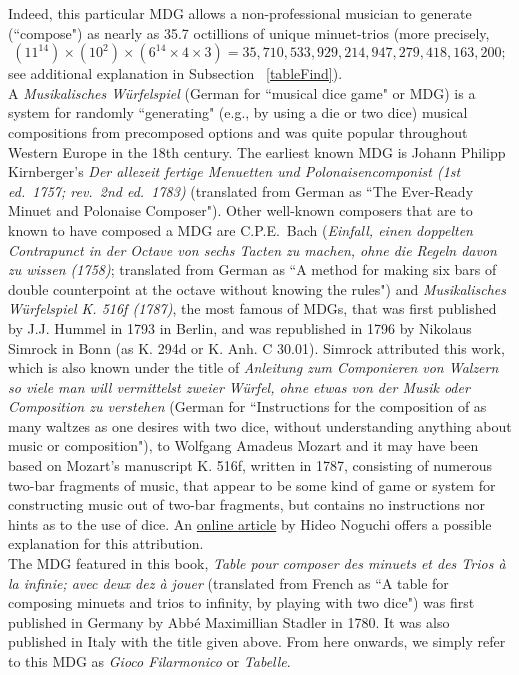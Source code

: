 \documentclass[a4paper,x11names,svgnames,10pt]{article}
\begin{document}
{Indeed, this particular MDG allows a non-professional musician to generate (``compose") as nearly as 35.7 octillions of unique minuet-trios (more precisely, $$(11^{14})\times(10^2)\times(6^{14}\times 4\times 3) = 35,710,533,929,214,947,279,418,163,200;$$ see additional explanation in Subsection ~\ref{tableFind}).\\  

A {\it Musikalisches W\"{u}rfelspiel} (German for ``musical dice game" or MDG) is a system for randomly ``generating" (e.g., by using a die or two dice) musical compositions from precomposed options and was quite popular throughout Western Europe in the 18th century.  The earliest known MDG is Johann Philipp Kirnberger's {\em Der allezeit fertige Menuetten und Polonaisencomponist (1st ed.\ 1757; rev.\ 2nd ed.\ 1783)} (translated from German as ``The Ever-Ready Minuet and Polonaise Composer").  Other well-known composers that are to known to have composed a MDG are C.P.E.\ Bach ({\em Einfall, einen doppelten Contrapunct in der Octave von sechs Tacten zu machen, ohne die Regeln davon zu wissen (1758)}; translated from German as ``A method for making six bars of double counterpoint at the octave without knowing the rules") and {\it Musikalisches W\"{u}rfelspiel K. 516f (1787)}, the most famous of MDGs, that was first published by J.J. Hummel in 1793 in Berlin, and was republished in 1796 by Nikolaus Simrock in Bonn (as K. 294d or K. Anh. C 30.01). Simrock attributed this work, which is also known under the title of {\em Anleitung zum Componieren von Walzern so viele man will vermittelst zweier Würfel, ohne etwas von der Musik oder Composition zu verstehen} (German for ``Instructions for the composition of as many waltzes as one desires with two dice, without understanding anything about music or composition"), to Wolfgang Amadeus Mozart and it may have been based on Mozart's manuscript K. 516f, written in 1787, consisting of numerous two-bar fragments of music, that appear to be some kind of game or system for constructing music out of two-bar fragments, but contains no instructions nor hints as to the use of dice.  An \href{(http://www.asahi-net.or.jp/\~rb5h-ngc/e/k516f.htm}{online article} by Hideo Noguchi offers a possible explanation for this attribution. \\

The MDG featured in this book, {\em Table pour composer des minuets et des Trios \`{a} la infinie; avec deux dez \`{a} jouer} (translated from French as  ``A table for composing minuets and trios to infinity, by playing with two dice") was first published in Germany by Abb\'{e} Maximillian Stadler in 1780. It was also published in Italy with the title given above. From here onwards, we simply refer to this MDG as {\em Gioco Filarmonico} or {\em Tabelle}. \\

}
\end{document}
